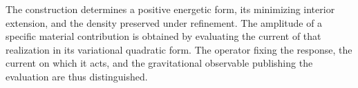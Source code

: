 The construction determines a positive energetic form, its minimizing
interior extension, and the density preserved under refinement.
The amplitude of a specific material contribution is obtained by evaluating
the current of that realization in its variational quadratic form.
The operator fixing the response, the current on which it acts,
and the gravitational observable publishing the evaluation are thus distinguished.
